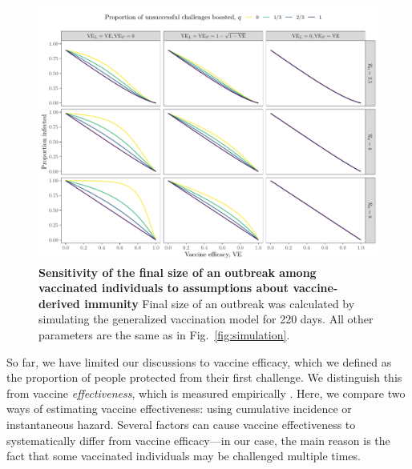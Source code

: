 \documentclass[12pt]{article}
\newcommand{\fref}[1]{Fig.~\ref{fig:#1}}
\begin{document}
\begin{figure}[!th]
\includegraphics[width=\textwidth]{outputs/figure_simulation_generalized.Rout.vaccinated.tikz.pdf}
\caption{
\textbf{Sensitivity of the final size of an outbreak among vaccinated individuals to assumptions about vaccine-derived immunity}
Final size of an outbreak was calculated by simulating the generalized vaccination model for 220 days.
All other parameters are the same as in \fref{simulation}.
\label{fig:sensitivity}
}
\end{figure}

So far, we have limited our discussions to vaccine efficacy, which we defined as the proportion of people protected from their first challenge. 
We distinguish this from vaccine \textit{effectiveness}, which is measured empirically \citep{halloran2009design}. 
Here, we compare two ways of estimating vaccine effectiveness: using cumulative incidence or instantaneous hazard.
Several factors can cause vaccine effectiveness to systematically differ from vaccine efficacy---in our case, the main reason is the fact that some vaccinated individuals may be challenged multiple times.
\end{document}
